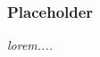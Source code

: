\documentclass[main]{subfiles}
\begin{document}
\subsubsection{Placeholder}
\textit{
  lorem....
}
\end{document}
